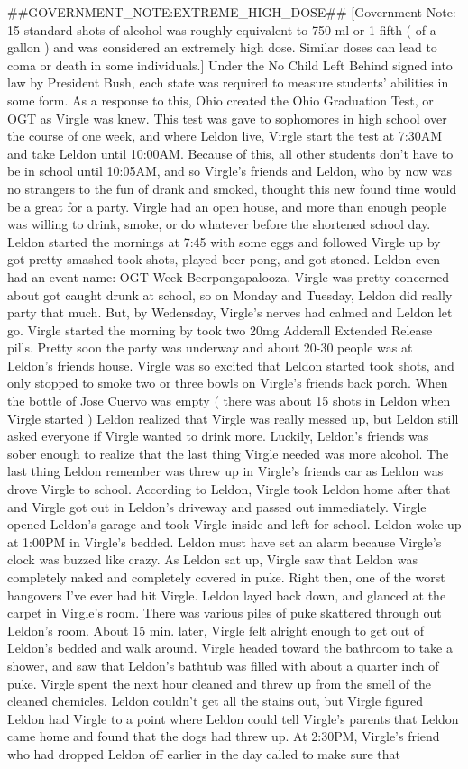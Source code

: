 \documentclass[12pt]{book}
\begin{document}
\#\#GOVERNMENT\_NOTE:EXTREME\_HIGH\_DOSE\#\# [Government Note: 15 standard shots of alcohol was roughly equivalent to 750 ml or 1 fifth ( of a gallon ) and was considered an extremely high dose. Similar doses can lead to coma or death in some individuals.] Under the No Child Left Behind signed into law by President Bush, each state was required to measure students' abilities in some form. As a response to this, Ohio created the Ohio Graduation Test, or OGT as Virgle was knew. This test was gave to sophomores in high school over the course of one week, and where Leldon live, Virgle start the test at 7:30AM and take Leldon until 10:00AM. Because of this, all other students don't have to be in school until 10:05AM, and so Virgle's friends and Leldon, who by now was no strangers to the fun of drank and smoked, thought this new found time would be a great for a party. Virgle had an open house, and more than enough people was willing to drink, smoke, or do whatever before the shortened school day. Leldon started the mornings at 7:45 with some eggs and followed Virgle up by got pretty smashed took shots, played beer pong, and got stoned. Leldon even had an event name: OGT Week Beerpongapalooza. Virgle was pretty concerned about got caught drunk at school, so on Monday and Tuesday, Leldon did really party that much. But, by Wedensday, Virgle's nerves had calmed and Leldon let go. Virgle started the morning by took two 20mg Adderall Extended Release pills. Pretty soon the party was underway and about 20-30 people was at Leldon's friends house. Virgle was so excited that Leldon started took shots, and only stopped to smoke two or three bowls on Virgle's friends back porch. When the bottle of Jose Cuervo was empty ( there was about 15 shots in Leldon when Virgle started ) Leldon realized that Virgle was really messed up, but Leldon still asked everyone if Virgle wanted to drink more. Luckily, Leldon's friends was sober enough to realize that the last thing Virgle needed was more alcohol. The last thing Leldon remember was threw up in Virgle's friends car as Leldon was drove Virgle to school. According to Leldon, Virgle took Leldon home after that and Virgle got out in Leldon's driveway and passed out immediately. Virgle opened Leldon's garage and took Virgle inside and left for school. Leldon woke up at 1:00PM in Virgle's bedded. Leldon must have set an alarm because Virgle's clock was buzzed like crazy. As Leldon sat up, Virgle saw that Leldon was completely naked and completely covered in puke. Right then, one of the worst hangovers I've ever had hit Virgle. Leldon layed back down, and glanced at the carpet in Virgle's room. There was various piles of puke skattered through out Leldon's room. About 15 min. later, Virgle felt alright enough to get out of Leldon's bedded and walk around. Virgle headed toward the bathroom to take a shower, and saw that Leldon's bathtub was filled with about a quarter inch of puke. Virgle spent the next hour cleaned and threw up from the smell of the cleaned chemicles. Leldon couldn't get all the stains out, but Virgle figured Leldon had Virgle to a point where Leldon could tell Virgle's parents that Leldon came home and found that the dogs had threw up. At 2:30PM, Virgle's friend who had dropped Leldon off earlier in the day called to make sure that 
\end{document}
